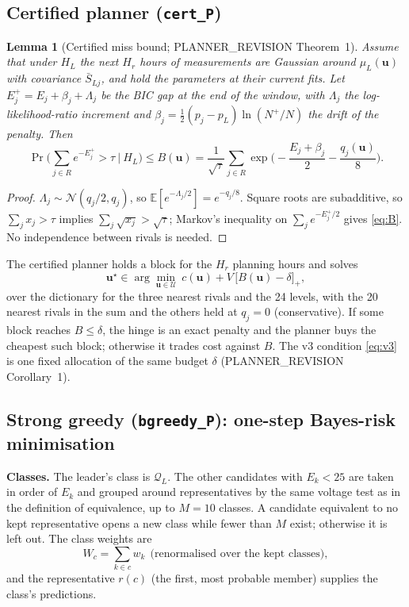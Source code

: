 \documentclass[11pt]{article}
\newtheorem{lemma}{Lemma}
\theoremstyle{definition}
\newcommand{\bu}{\bm{u}}
\newcommand{\cU}{\mathcal{U}}
\newcommand{\cQ}{\mathcal{Q}}
\newcommand{\code}[1]{\texttt{#1}}
\begin{document}
{\subsection{Certified planner (\code{cert\_P})}
\begin{lemma}[Certified miss bound; PLANNER\_REVISION Theorem~1]\label{lem:cert}
Assume that under $H_L$ the next $H_r$ hours of measurements are Gaussian around $\mu_L(\bu)$ with covariance $\bar S_{Lj}$, and hold the parameters at their current fits. Let $E_j^+=E_j+\beta_j+\Lambda_j$ be the BIC gap at the end of the window, with $\Lambda_j$ the log-likelihood-ratio increment and $\beta_j=\tfrac12(p_j-p_L)\ln(N^+/N)$ the drift of the penalty. Then
\begin{equation}\label{eq:B}
  \Pr\Big(\sum_{j\in R}e^{-E_j^+}>\tau\ \Big|\ H_L\Big)\le B(\bu)=\frac{1}{\sqrt\tau}\sum_{j\in R}\exp\!\Big(-\frac{E_j+\beta_j}{2}-\frac{q_j(\bu)}{8}\Big).
\end{equation}
\end{lemma}
\begin{proof}
$\Lambda_j\sim\mathcal N(q_j/2,q_j)$, so $\mathbb E[e^{-\Lambda_j/2}]=e^{-q_j/8}$. Square roots are subadditive, so $\sum_j x_j>\tau$ implies $\sum_j\sqrt{x_j}>\sqrt\tau$; Markov's inequality on $\sum_j e^{-E_j^+/2}$ gives \eqref{eq:B}. No independence between rivals is needed.
\end{proof}
The certified planner holds a block for the $H_r$ planning hours and solves
\begin{equation}\label{eq:certP}
  \bu^\star\in\arg\min_{\bu\in\cU}\ c(\bu)+V\,\big[B(\bu)-\delta\big]_+ ,
\end{equation}
over the dictionary for the three nearest rivals and the 24 levels, with the 20 nearest rivals in the sum and the others held at $q_j=0$ (conservative). If some block reaches $B\le\delta$, the hinge is an exact penalty and the planner buys the cheapest such block; otherwise it trades cost against $B$. The v3 condition \eqref{eq:v3} is one fixed allocation of the same budget $\delta$ (PLANNER\_REVISION Corollary~1).

\subsection{Strong greedy (\code{bgreedy\_P}): one-step Bayes-risk minimisation}\label{sec:bgreedy}
\textbf{Classes.} The leader's class is $\cQ_L$. The other candidates with $E_k<25$ are taken in order of $E_k$ and grouped around representatives by the same voltage test as in the definition of equivalence, up to $M=10$ classes. A candidate equivalent to no kept representative opens a new class while fewer than $M$ exist; otherwise it is left out. The class weights are
\begin{equation}\label{eq:W}
  W_c=\sum_{k\in c}w_k\ \ \text{(renormalised over the kept classes)},
\end{equation}
and the representative $r(c)$ (the first, most probable member) supplies the class's predictions.

}
\end{document}
